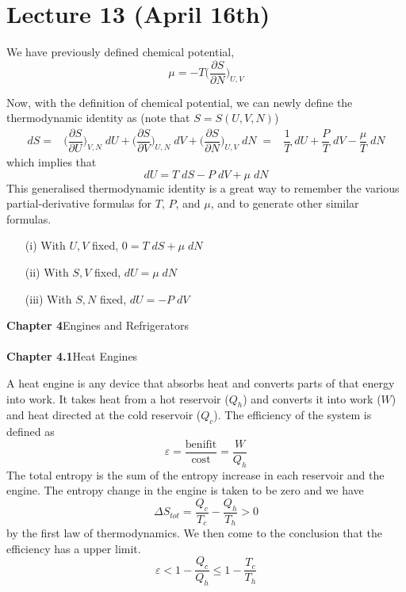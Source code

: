 \section{Lecture 13 (April 16th)}
\begin{recall}
We have previously defined chemical potential,
\[\mu =-T\Big(\dfrac{\partial S}{\partial N} \Big)_{U,V} \]
\end{recall}
\vspace{2ex}
\begin{thm}
Now, with the definition of chemical potential, we can newly define the thermodynamic identity as (note that $S=S(U,V,N)$)
\begin{align*}
dS=&\Big(\dfrac{\partial S}{\partial U}\Big)_{V,N}\;dU+\Big(\dfrac{\partial S}{\partial V} \Big)_{U,N}\;dV+\Big(\dfrac{\partial S}{\partial N}\Big)_{U,V}\;dN\;
=&\dfrac{1}{T}\;dU+\dfrac{P}{T}\;dV-\dfrac{\mu }{T}\;dN
\end{align*}
which implies that
\[dU=T\;dS-P\;dV+\mu \;dN\]
This generalised thermodynamic identity is a great way to remember the various partial-derivative formulas for $T$, $P$, and $\mu $, and to generate other similar formulas. 
\begin{itemize}
\item[(i)] With $U,V$ fixed, $0=T\;dS+\mu \;dN$
\item[(ii)] With $S,V$ fixed, $dU=\mu \;dN$
\item[(iii)] With $S,N$ fixed, $dU=-P\;dV$
\end{itemize}
\end{thm}
\vspace{2ex}
{\bf Chapter 4}\hspace{2ex}Engines and Refrigerators
\\\\
{\bf Chapter 4.1}\hspace{2ex}Heat Engines
\\
\begin{defi}
A heat engine is any device that absorbs heat and converts parts of that energy into work. It takes heat from a hot reservoir ($Q_{h}$) and converts it into work ($W$) and heat directed at the cold reservoir ($Q_{c}$). The efficiency of the system is defined as
\[\varepsilon =\dfrac{\mathrm{benifit}}{\mathrm{cost}}=\dfrac{W}{Q_{h}}\]
The total entropy is the sum of the entropy increase in each reservoir and the engine. The entropy change in the engine is taken to be zero and we have
\[\Delta S_{tot}=\dfrac{Q_{c}}{T_{c}}-\dfrac{Q_{h}}{T_{h}}>0\]
by the first law of thermodynamics. We then come to the conclusion that the efficiency has a upper limit.
\[\varepsilon <1-\dfrac{Q_{c}}{Q_{h}}\leq 1-\dfrac{T_{c}}{T_{h}}\]

\end{defi}
\vspace{2ex}

